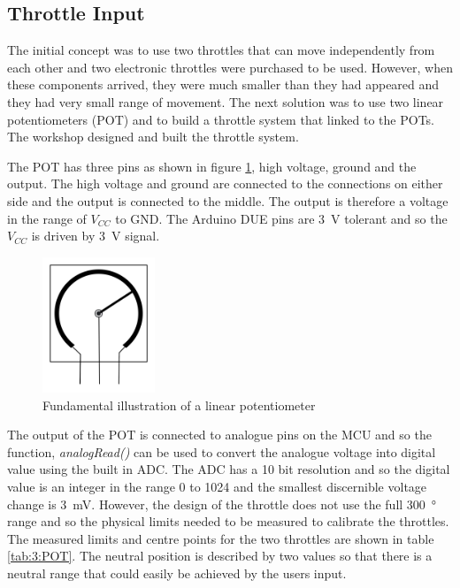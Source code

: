 \subsection{Throttle Input}
The initial concept was to use two throttles that can move independently from each other and %
two electronic throttles were 
purchased to be used. However, when these components arrived, they were much smaller than they had appeared and they had very small range of movement. The next solution was to use two linear potentiometers (POT) and to build a throttle system that linked to the POTs. The workshop designed and built the throttle system.
\par
\vspace{0.4cm}
The POT has three pins as shown in figure \ref{fig:3:POTdraw}, high voltage, ground and the output. The high voltage and ground are connected to the connections on either side and the output is connected to the middle. The output is therefore a voltage in the range of $V_{CC}$ to GND. The Arduino DUE pins are \SI{3}{\volt} tolerant and so the $V_{CC}$ is driven by \SI{3}{\volt} signal. \par
\vspace{0.4cm}
\begin{figure}[ht]
\begin{center}
\includegraphics[width = 0.3\textwidth]{figures/POT.jpg}
\caption{Fundamental illustration of a linear potentiometer}
\label{fig:3:POTdraw}
\end{center}
\end{figure}
The output of the POT is connected to analogue pins on the MCU and so the function, \textit{analogRead()} can be used to convert the analogue voltage into digital value using the built in ADC. The ADC has a 10 bit resolution and so the digital value is an integer in the range 0 to 1024 and the smallest discernible voltage change is \SI{3}{\milli\volt}. However, the design of the throttle does not use the full \SI{300}{\degree} range and so the physical limits needed to be measured to calibrate the throttles. The measured limits and centre points for the two throttles are shown in table \ref{tab:3:POT}. The neutral position is described by two values so that there is a neutral range that could easily be achieved by the users input. \par

